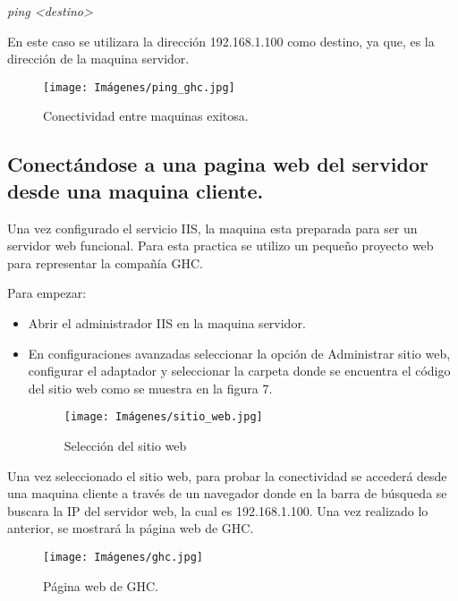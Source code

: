 \documentclass[letterpaper,12pt]{article} %
\begin{document}
\textit{ping <destino>}\par

En este caso se utilizara la dirección 192.168.1.100 como destino, ya que, es la dirección de la maquina servidor.

\begin{figure}[htp!]
    \centering
    \texttt{[image: Imágenes/ping\_ghc.jpg]}
    \caption{Conectividad entre maquinas exitosa.}
    \label{fig:ping_ghc}
\end{figure}

\newpage

\subsection{Conectándose a una pagina web del servidor desde una maquina cliente.}

Una vez configurado el servicio IIS, la maquina esta preparada para ser un servidor web funcional. Para esta practica se utilizo un pequeño proyecto web para representar la compañía GHC.

Para empezar:
\begin{itemize}
    \item Abrir el administrador IIS en la maquina servidor.
    \item En configuraciones avanzadas seleccionar la opción de Administrar sitio web, configurar el adaptador y seleccionar la carpeta donde se encuentra el código del sitio web como se muestra en la figura 7.
    
    \begin{figure}[htp!]
        \centering
        \texttt{[image: Imágenes/sitio\_web.jpg]}
        \caption{Selección del sitio web}
        \label{fig:sitio_web}
    \end{figure}
\end{itemize}

\newpage

Una vez seleccionado el sitio web, para probar la conectividad se accederá desde una maquina cliente a través de un navegador donde en la barra de búsqueda se buscara la IP del servidor web, la cual es 192.168.1.100. Una vez realizado lo anterior, se mostrará la página web de GHC.

\begin{figure}[htp!]
    \centering
    \texttt{[image: Imágenes/ghc.jpg]}
    \caption{Página web de GHC.}
    \label{fig:ghc}
\end{figure}
\end{document}
